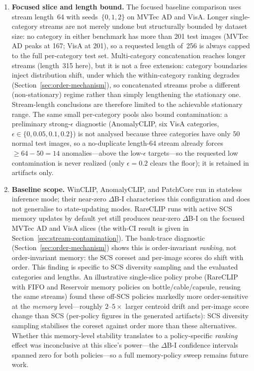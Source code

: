 \documentclass[runningheads]{llncs}
\newcommand{\secref}[1]{Section~\ref{#1}}
\begin{document}
\begin{enumerate}
\item \textbf{Focused slice and length bound.} The focused baseline comparison
uses stream length~64 with seeds~$\{0,1,2\}$ on MVTec AD and VisA. Longer
single-category streams are not merely undone but structurally bounded by
dataset size: no category in either benchmark has more than 201 test images
(MVTec AD peaks at 167; VisA at 201), so a requested length of~256 is always
capped to the full per-category test set. Multi-category concatenation reaches
longer streams (length~315 here), but it is not a free extension: category
boundaries inject distribution shift, under which the within-category ranking
degrades (\secref{sec:order-mechanism}), so concatenated streams probe a
different (non-stationary) regime rather than simply lengthening the stationary
one. Stream-length conclusions are therefore limited to the achievable stationary
range. The same small per-category pools also bound contamination: a preliminary
strong-$\epsilon$ diagnostic (AnomalyCLIP, six VisA categories, $\epsilon \in
\{0,0.05,0.1,0.2\}$) is not analysed because three categories have only 50 normal
test images, so a no-duplicate length-64 stream already forces $\geq 64-50=14$
anomalies---above the low-$\epsilon$ targets---so the requested low contamination
is never realized (only $\epsilon=0.2$ clears the floor); it is retained in
artifacts only.

\item \textbf{Baseline scope.} WinCLIP, AnomalyCLIP, and PatchCore run in
stateless inference mode; their near-zero $\Delta$B-I characterises this
configuration and does not generalise to state-updating modes. RareCLIP runs
with active SCS memory updates by default yet still produces near-zero
$\Delta$B-I on the focused MVTec AD and VisA slices (the with-CI result is given in
\secref{sec:stream-contamination}). The bank-trace diagnostic
(\secref{sec:order-mechanism}) shows this is order-invariant \emph{ranking}, not
order-invariant memory: the SCS coreset and per-image scores do shift with
order. This finding is specific to SCS diversity sampling and the evaluated
categories and lengths. An illustrative single-slice policy probe (RareCLIP with
FIFO and Reservoir memory policies on bottle/cable/capsule, reusing the same
streams) found these off-SCS policies markedly more order-sensitive at the
\emph{memory} level---roughly $2$--$5\times$ larger centroid drift and per-image
score change than SCS (per-policy figures in the generated artifacts): SCS
diversity sampling stabilises the coreset against order more than these
alternatives. Whether this memory-level stability translates to a policy-specific
\emph{ranking} effect was inconclusive at this slice's power---the $\Delta$B-I
confidence intervals spanned zero for both policies---so a full memory-policy
sweep remains future work.


\end{enumerate}
\end{document}
